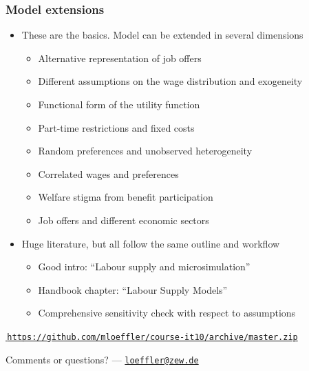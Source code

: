 \documentclass[handout,intlimits]{beamer}
\newcommand{\beginbackup}{
	\newcounter{framenumberpreappendix}
	\setcounter{framenumberpreappendix}{\value{framenumber}}
}
\def\litc#1{\textcolor{med-gray}{\tiny\citep{#1}}}
\def\blue#1{\textcolor{zewblue}{#1}}
\begin{document}
\begin{frame}
\frametitle{Model extensions}
\begin{itemize}
	\item \blue{These are the basics. Model can be extended in several dimensions}
	\begin{itemize}
		\item Alternative representation of job offers \litc{aaberge_etal_2009, dagsvik_etal_2014}
		\smallskip
		\item Different assumptions on the wage distribution and exogeneity \litc{loeffler_etal_2014}
		\smallskip
		\item Functional form of the utility function \litc{vansoest_etal_2002, loeffler_etal_2014}
		\smallskip
		\item Part-time restrictions and fixed costs \litc{vansoest_1995, euwals_vansoest_1999}
		\smallskip
		\item Random preferences and unobserved heterogeneity \litc{vansoest_1995, pacifico_2013}
		\smallskip
		\item Correlated wages and preferences \litc{breunig_etal_2008, blundell_shephard_2012}
		\smallskip
		\item Welfare stigma from benefit participation \litc{hoynes_1996, keane_moffitt_1998}
		\smallskip
		\item Job offers and different economic sectors \litc{dagsvik_strom_2006}
	\end{itemize}
	\bigskip
	\item \blue{Huge literature, but all follow the same outline and workflow}
	\begin{itemize}
		\item Good intro: ``Labour supply and microsimulation'' \litc{creedy_kalb_2005, creedy_kalb_2006}
		\smallskip
		\item Handbook chapter: ``Labour Supply Models'' \litc{aaberge_colombino_2014}
		\smallskip
		\item Comprehensive sensitivity check with respect to assumptions \litc{loeffler_etal_2014}
	\end{itemize}
\end{itemize}
\end{frame}


\beginbackup

\begin{frame}
\bigskip\bigskip
\href{https://github.com/mloeffler/course-it10/archive/master.zip}{\blue{\,\nolinkurl{https://github.com/mloeffler/course-it10/archive/master.zip}}}

\begin{center}\bigskip\bigskip
	Comments or questions? --- \href{mailto:loeffler@zew.de}{\blue{\nolinkurl{loeffler@zew.de}}}
\end{center}
\end{frame}
\end{document}
